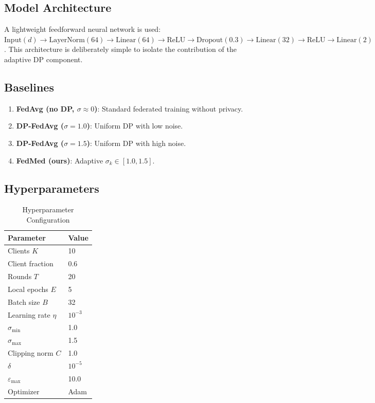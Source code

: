 \documentclass[journal]{IEEEtran}
\begin{document}
\subsection{Model Architecture}
A lightweight feedforward neural network is used:
$\mathrm{Input}(d) \to \mathrm{LayerNorm}(64) \to \mathrm{Linear}(64) \to
\mathrm{ReLU} \to \mathrm{Dropout}(0.3) \to \mathrm{Linear}(32) \to
\mathrm{ReLU} \to \mathrm{Linear}(2)$.
This architecture is deliberately simple to isolate the contribution of the
adaptive DP component.

\subsection{Baselines}
\begin{enumerate}
  \item \textbf{FedAvg (no DP, $\sigma{\approx}0$)}: Standard federated
        training without privacy.
  \item \textbf{DP-FedAvg ($\sigma{=}1.0$)}: Uniform DP with low noise.
  \item \textbf{DP-FedAvg ($\sigma{=}1.5$)}: Uniform DP with high noise.
  \item \textbf{FedMed (ours)}: Adaptive $\sigma_k\in[1.0,1.5]$.
\end{enumerate}

\subsection{Hyperparameters}
\begin{table}[!t]
\caption{Hyperparameter Configuration}
\label{tab:hyper}
\centering
\begin{tabular}{ll}
\toprule
\textbf{Parameter} & \textbf{Value} \\
\midrule
Clients $K$              & 10 \\
Client fraction          & 0.6 \\
Rounds $T$               & 20 \\
Local epochs $E$         & 5 \\
Batch size $B$           & 32 \\
Learning rate $\eta$     & $10^{-3}$ \\
$\sigma_{\min}$          & 1.0 \\
$\sigma_{\max}$          & 1.5 \\
Clipping norm $C$        & 1.0 \\
$\delta$                 & $10^{-5}$ \\
$\varepsilon_{\max}$     & 10.0 \\
Optimizer                & Adam \\
\bottomrule
\end{tabular}
\end{table}
\end{document}
